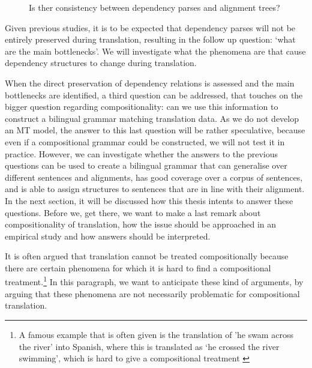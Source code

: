 \documentclass[hidelinks]{report}
\begin{document}
\begin{figure}[!ht]

\centering

\caption{Is ther consistency between dependency parses and alignment trees?}\label{fig:depshats}
\end{figure}

Given previous studies, it is to be expected that dependency parses will not be entirely preserved during translation, resulting in the follow up question: `what are the main bottlenecks'. We will investigate what the phenomena are that cause dependency structures to change during translation.

When the direct preservation of dependency relations is assessed and the main bottlenecks are identified, a third question can be addressed, that touches on the bigger question regarding compositionality: can we use this information to construct a bilingual grammar matching translation data. As we do not develop an MT model, the answer to this last question will be rather speculative, because even if a compositional grammar could be constructed, we will not test it in practice. However, we can investigate whether the answers to the previous questions can be used to create a bilingual grammar that can generalise over different sentences and alignments, has good coverage over a corpus of sentences, and is able to assign structures to sentences that are in line with their alignment.\\

In the next section, it will be discussed how this thesis intents to answer these questions. Before we, get there, we want to make a last remark about compositionality of translation, how the issue should be approached in an empirical study and how answers should be interpreted.

It is often argued that translation cannot be treated compositionally because there are certain phenomena for which it is hard to find a compositional treatment.\footnote{A famous example that is often given is the translation of 'he swam across the river' into Spanish, where this is translated as `he crossed the river swimming', which is hard to give a compositional treatment \citep{landsbergen1989power}} In this paragraph, we want to anticipate these kind of arguments, by arguing that these phenomena are not necessarily problematic for compositional translation.
\end{document}

